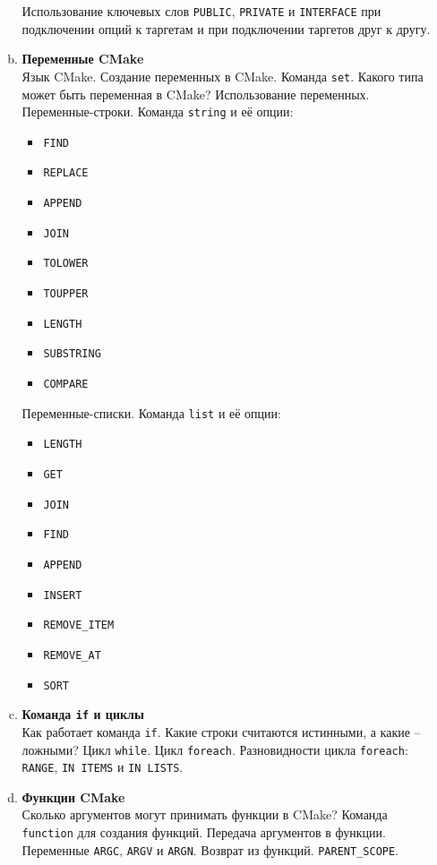 \documentclass{article}
\begin{document}
\begin{enumerate}
\begin{enumerate}[a.]
Использование ключевых слов \texttt{PUBLIC}, \texttt{PRIVATE} и \texttt{INTERFACE} при подключении опций к таргетам и при подключении таргетов друг к другу.

\item \textbf{Переменные CMake}\\
Язык CMake. Создание переменных в CMake. Команда \texttt{set}. Какого типа может быть переменная в CMake? Использование переменных. Переменные-строки. Команда \texttt{string} и её опции:
\noindent \begin{multicols}{3}
\begin{itemize}
\item \texttt{FIND}
\item \texttt{REPLACE}
\item \texttt{APPEND}
\item \texttt{JOIN}
\item \texttt{TOLOWER}
\item \texttt{TOUPPER}
\item \texttt{LENGTH}
\item \texttt{SUBSTRING}
\item \texttt{COMPARE}
\end{itemize}
\end{multicols}
\noindent Переменные-списки. Команда \texttt{list} и её опции:
\noindent \begin{multicols}{3}
\begin{itemize}
\item \texttt{LENGTH}
\item \texttt{GET}
\item \texttt{JOIN}
\item \texttt{FIND}
\item \texttt{APPEND}
\item \texttt{INSERT}
\item \texttt{REMOVE\_ITEM}
\item \texttt{REMOVE\_AT}
\item \texttt{SORT}
\end{itemize}
\end{multicols}

\item \textbf{Команда \texttt{if} и циклы}\\
Как работает команда \texttt{if}. Какие строки считаются истинными, а какие -- ложными?
Цикл \texttt{while}. Цикл \texttt{foreach}. Разновидности цикла \texttt{foreach}: \texttt{RANGE}, \texttt{IN ITEMS} и \texttt{IN LISTS}.

\item \textbf{Функции CMake}\\
Сколько аргументов могут принимать функции в CMake? Команда \texttt{function} для создания функций. Передача аргументов в функции. Переменные \texttt{ARGC}, \texttt{ARGV} и \texttt{ARGN}. Возврат из функций. \texttt{PARENT\_SCOPE}.


\end{enumerate}
\end{enumerate}
\end{document}
